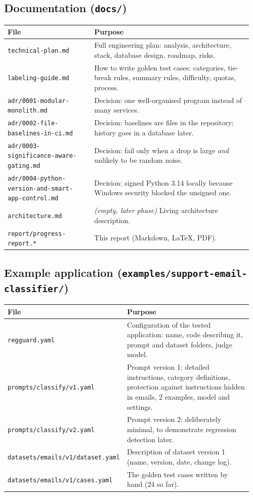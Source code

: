 \documentclass[11pt,a4paper]{article}
\newcommand{\code}[1]{\nolinkurl{#1}}
\newcommand{\empt}{\textit{(empty, later phase)}}
\begin{document}
\subsection{Documentation (\texorpdfstring{\texttt{docs/}}{docs/})}
\begin{longtable}{@{}p{0.34\linewidth}p{0.62\linewidth}@{}}
\toprule
\textbf{File} & \textbf{Purpose} \\
\midrule
\endhead
\code{technical-plan.md} & Full engineering plan: analysis, architecture, stack, database design, roadmap, risks. \\
\code{labeling-guide.md} & How to write golden test cases: categories, tie-break rules, summary rules, difficulty, quotas, process. \\
\code{adr/0001-modular-monolith.md} & Decision: one well-organised program instead of many services. \\
\code{adr/0002-file-baselines-in-ci.md} & Decision: baselines are files in the repository; history goes in a database later. \\
\code{adr/0003-significance-aware-gating.md} & Decision: fail only when a drop is large \emph{and} unlikely to be random noise. \\
\code{adr/0004-python-version-and-smart-app-control.md} & Decision: signed Python 3.14 locally because Windows security blocked the unsigned one. \\
\code{architecture.md} & \empt{} Living architecture description. \\
\code{report/progress-report.*} & This report (Markdown, LaTeX, PDF). \\
\bottomrule
\end{longtable}

\subsection{Example application (\texorpdfstring{\texttt{examples/support-email-classifier/}}{examples/support-email-classifier/})}
\begin{longtable}{@{}p{0.34\linewidth}p{0.62\linewidth}@{}}
\toprule
\textbf{File} & \textbf{Purpose} \\
\midrule
\endhead
\code{regguard.yaml} & Configuration of the tested application: name, code describing it, prompt and dataset folders, judge model. \\
\code{prompts/classify/v1.yaml} & Prompt version 1: detailed instructions, category definitions, protection against instructions hidden in emails, 2 examples, model and settings. \\
\code{prompts/classify/v2.yaml} & Prompt version 2: deliberately minimal, to demonstrate regression detection later. \\
\code{datasets/emails/v1/dataset.yaml} & Description of dataset version 1 (name, version, date, change log). \\
\code{datasets/emails/v1/cases.yaml} & The golden test cases written by hand (24 so far). \\
\bottomrule
\end{longtable}
\end{document}
